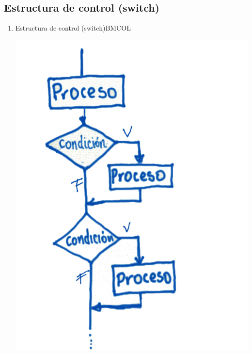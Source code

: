 \documentclass[presentation, aspectratio=54]{beamer}
\begin{document}
\subsection{Estructura de control (switch)}
\label{sec:orgedcd3a4}
\begin{enumerate}
\item Estructura de control (switch)\hfill{}\textsc{BMCOL}
\label{sec:orgd5a37b4}
\begin{center}
\includegraphics[width=.9\linewidth]{./images/codigo/ifexcluyentes.png}
\end{center}


\end{enumerate}
\end{document}
